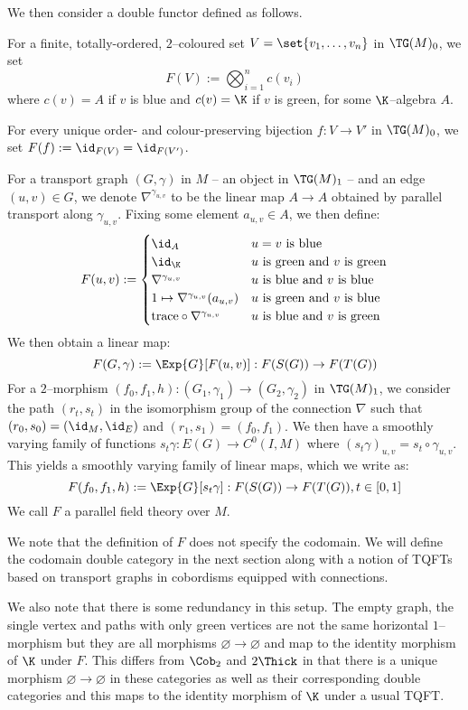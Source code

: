 \documentclass[./Thick_TQFTs_and_Quantum_Information.tex]{subfiles}
\begin{document}
We then consider a double functor defined as follows.

\begin{defn}\label{defn:sing_man_tqft}
For a finite, totally-ordered, $2$--coloured set
$V = \set{v_1, \dots, v_n}$ in $\TG(M)_0$, we set
\[
  F(V) := \bigotimes_{i = 1}^{n} c(v_i)
\]
where $c(v) = A$ if $v$ is blue and $c(v) = \K$ if $v$ is green,
for some $\K$--algebra $A$.

For every unique order- and colour-preserving bijection $f : V \to V'$ in
$\TG(M)_0$, we set $F(f) := \id_{F(V)} = \id_{F(V')}$.

For a transport graph $(G, \gamma)$ in $M$ -- an object in $\TG(M)_1$ -- and an
edge $(u, v) \in G$, we denote $\nabla^{\gamma_{u, v}}$ to be the linear map
$A \to A$ obtained by parallel transport along $\gamma_{u, v}$. Fixing some
element $a_{u, v} \in A$, we then define:
\[
  F(u, v) := \begin{cases}
    \id_A
      & u = v \text{ is blue} \\
    \id_{\K} %
      & u \text{ is green and } v \text{ is green} \\
    \nabla^{\gamma_{u, v}}
      & u \text{ is blue and } v \text{ is blue} \\
    1 \mapsto \nabla^{\gamma_{u, v}}(a_{u, v})
      & u \text{ is green and } v \text{ is blue} \\
    \text{trace} \circ \nabla^{\gamma_{u, v}}
      & u \text{ is blue and } v \text{ is green}
  \end{cases}
\]
We then obtain a linear map:
\[
  F(G, \gamma) := \Exp{G}[F(u, v)]
               :  F(S(G)) \to F(T(G))
\]
For a $2$--morphism
$(f_0, f_1, h) : (G_1, \gamma_1) \to (G_2, \gamma_2)$ in $\TG(M)_1$, we consider
the path $(r_t, s_t)$ in the isomorphism group of the connection $\nabla$ such
that $(r_0, s_0) = (\id_M, \id_E)$ and $(r_1, s_1) = (f_0, f_1)$. We then have a
smoothly varying family of functions $s_t\gamma : E(G) \to C^0(I, M)$
where $(s_t\gamma)_{u, v} = s_t \circ \gamma_{u, v}$. This yields a smoothly
varying family of linear maps, which we write as:
\[
  F(f_0, f_1, h) := \Exp{G}[s_t\gamma]
    : F(S(G)) \to F(T(G)), t \in [0, 1]
\]
We call $F$ a parallel field theory over $M$.
\end{defn}


We note that the definition of $F$ does not specify the codomain. We will define
the codomain double category in the next section along with a notion of TQFTs
based on transport graphs in cobordisms equipped with connections.

We also note that there is some redundancy in this setup. The empty graph, the
single vertex and paths with only green vertices are not the same horizontal
$1$--morphism but they are all morphisms $\varnothing \to \varnothing$ and map
to the identity morphism of $\K$ under $F$. This differs from $\Cob_2$ and
$2\Thick$ in that there is a unique morphism $\varnothing \to \varnothing$ in
these categories as well as their corresponding double categories and this maps
to the identity morphism of $\K$ under a usual TQFT.
\end{document}
